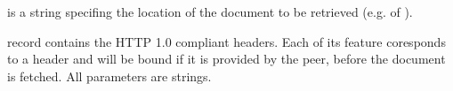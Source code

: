 \documentclass{ozdoc}
\begin{document}
 is a string specifing the  location of the document to be retrieved (e.g.  of ). \mozartEMPTY


\label{SUBSECTION.OUTPRMS}



\begin{mozartDESCRIPTION}
\mozartENTRYHASCODE
\begin{mozartSYNOPSIS}
\begin{mozartCODEDISPLAY}\mozartFACETEXT{)\mozartSPACE{}}\end{mozartCODEDISPLAY}
\end{mozartSYNOPSIS}
\mozartITEM {} record contains the HTTP 1.0 compliant headers. Each of its feature coresponds to a header and will be bound if it is provided by the peer, before the document is fetched. All parameters are strings.


\end{mozartDESCRIPTION}
\end{document}
